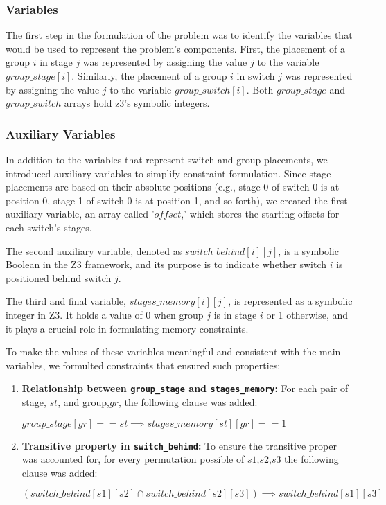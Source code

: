 \subsubsection{Variables}

The first step in the formulation of the problem was to identify the variables that would be used to represent the problem's components. 
First, the placement of a group \(i\) in stage \(j\) was represented by assigning the value $j$ to the variable \(group\_stage[i]\). Similarly, the placement of a group \(i\) in switch \(j\) was represented by assigning the value $j$ to the variable \(group\_switch[i]\). Both \(group\_stage\) and \(group\_switch\) arrays hold z3's symbolic integers.

\subsubsection{Auxiliary Variables}

In addition to the variables that represent switch and group placements, we introduced auxiliary variables to simplify constraint formulation. Since stage placements are based on their absolute positions (e.g., stage 0 of switch 0 is at position 0, stage 1 of switch 0 is at position 1, and so forth), we created the first auxiliary variable, an array called '$offset$,' which stores the starting offsets for each switch's stages.

The second auxiliary variable, denoted as $switch\_behind[i][j]$, is a symbolic Boolean in the Z3 framework, and its purpose is to indicate whether switch \(i\) is positioned behind switch \(j\). 

The third and final variable, $stages\_memory[i][j]$, is represented as a symbolic integer in Z3. It holds a value of 0 when group \(j\) is in stage \(i\) or 1 otherwise, and it plays a crucial role in formulating memory constraints.

To make the values of these variables meaningful and consistent with the main variables, we formulted constraints that ensured such properties:

\begin{enumerate}
    \item \textbf{Relationship between \texttt{group\_stage} and \texttt{stages\_memory}:} For each pair of stage, $st$, and group,$gr$, the following clause was added:
    \begin{center}
        \(group\_stage[gr] == st \implies stages\_memory[st][gr] == 1\)
    \end{center}

    \item \textbf{Transitive property in \texttt{switch\_behind}:} To ensure the transitive proper was accounted for, for every permutation possible of $s1$,$s2$,$s3$ the following clause was added:
    \begin{center}
        \((switch\_behind[s1][s2] \cap switch\_behind[s2][s3]) \implies switch\_behind[s1][s3]\)
    \end{center}
\end{enumerate}


